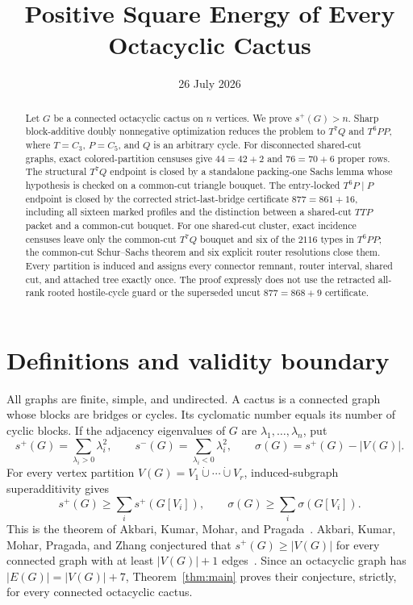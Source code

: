 \documentclass[11pt]{article}
\title{Positive Square Energy of Every Octacyclic Cactus}
\author{}
\date{26 July 2026}
\newcommand{\spE}{s^+}
\newcommand{\smE}{s^-}
\newcommand{\sig}{\sigma}
\begin{document}
\maketitle

\begin{abstract}
Let $G$ be a connected octacyclic cactus on $n$ vertices.  We prove
$s^+(G)>n$.  Sharp block-additive doubly nonnegative optimization reduces the
problem to $T^7Q$ and $T^6PP$, where $T=C_3$, $P=C_5$, and $Q$ is an arbitrary
cycle.  For disconnected shared-cut graphs, exact colored-partition censuses
give $44=42+2$ and $76=70+6$ proper rows.  The structural $T^7Q$ endpoint is
closed by a standalone packing-one Sachs lemma whose hypothesis is checked on
a common-cut triangle bouquet.  The entry-locked $T^6P\mid P$ endpoint is
closed by the corrected strict-last-bridge certificate $877=861+16$, including
all sixteen marked profiles and the distinction between a shared-cut $TTP$
packet and a common-cut bouquet.  For one shared-cut cluster, exact incidence
censuses leave only the common-cut $T^7Q$ bouquet and six of the $2116$ types
in $T^6PP$; the common-cut Schur--Sachs theorem and six explicit router
resolutions close them.  Every partition is induced and assigns every
connector remnant, router interval, shared cut, and attached tree exactly once.
The proof expressly does not use the retracted all-rank rooted hostile-cycle
guard or the superseded uncut $877=868+9$ certificate.
\end{abstract}

\section{Definitions and validity boundary}

All graphs are finite, simple, and undirected.  A cactus is a connected graph
whose blocks are bridges or cycles.  Its cyclomatic number equals its number of
cyclic blocks.  If the adjacency eigenvalues of $G$ are
$\lambda_1,\ldots,\lambda_n$, put
\[
 \spE(G)=\sum_{\lambda_i>0}\lambda_i^2,
 \qquad \smE(G)=\sum_{\lambda_i<0}\lambda_i^2,
 \qquad \sig(G)=\spE(G)-|V(G)|.
\]
For every vertex partition $V(G)=V_1\mathbin{\dot\cup}\cdots
\mathbin{\dot\cup}V_r$, induced-subgraph superadditivity gives
\begin{equation}\label{eq:super}
 \spE(G)\geq\sum_i\spE(G[V_i]),
 \qquad \sig(G)\geq\sum_i\sig(G[V_i]).
\end{equation}
This is the theorem of Akbari, Kumar, Mohar, and Pragada~\cite{AKMP}.
Akbari, Kumar, Mohar, Pragada, and Zhang conjectured that
$s^+(G)\geq |V(G)|$ for every connected graph with at least
$|V(G)|+1$ edges~\cite[Conjecture~1.2]{AKMPZ}.  Since an octacyclic graph has
$|E(G)|=|V(G)|+7$, Theorem~\ref{thm:main} proves their conjecture, strictly,
for every connected octacyclic cactus.
\end{document}

